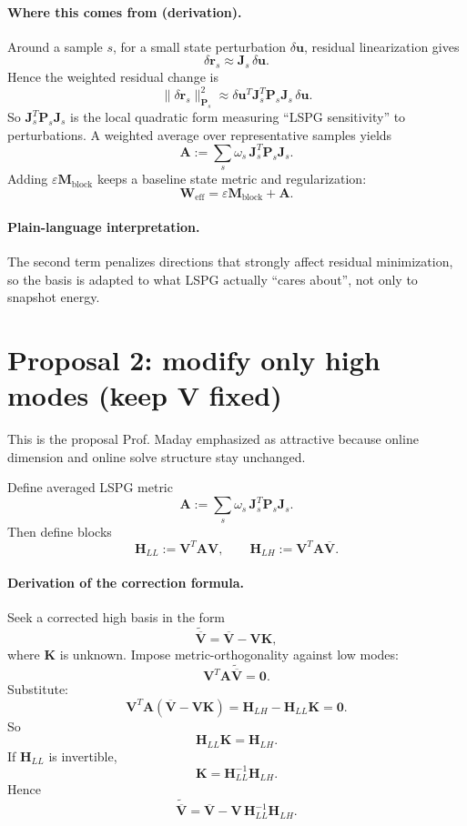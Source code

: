 \documentclass[11pt]{article}
\begin{document}
\paragraph{Where this comes from (derivation).}
Around a sample $s$, for a small state perturbation $\delta\mathbf u$, residual linearization gives
\[
\delta\mathbf r_s\approx \mathbf J_s\,\delta\mathbf u.
\]
Hence the weighted residual change is
\[
\|\delta\mathbf r_s\|_{\mathbf P_s}^2
\approx
\delta\mathbf u^T\mathbf J_s^T\mathbf P_s\mathbf J_s\,\delta\mathbf u.
\]
So $\mathbf J_s^T\mathbf P_s\mathbf J_s$ is the local quadratic form measuring ``LSPG sensitivity'' to perturbations.
A weighted average over representative samples yields
\[
\mathbf A:=\sum_s\omega_s\,\mathbf J_s^T\mathbf P_s\mathbf J_s.
\]
Adding $\varepsilon\mathbf M_{\mathrm{block}}$ keeps a baseline state metric and regularization:
\[
\mathbf W_{\mathrm{eff}}=\varepsilon\mathbf M_{\mathrm{block}}+\mathbf A.
\]

\paragraph{Plain-language interpretation.}
The second term penalizes directions that strongly affect residual minimization, so the basis is adapted to what LSPG actually ``cares about'', not only to snapshot energy.

\section{Proposal 2: modify only high modes (keep $\mathbf V$ fixed)}
This is the proposal Prof. Maday emphasized as attractive because online dimension and online solve structure stay unchanged.

Define averaged LSPG metric
\[
\mathbf A:=\sum_s \omega_s\,\mathbf J_s^T\mathbf P_s\mathbf J_s.
\]
Then define blocks
\[
\mathbf H_{LL}:=\mathbf V^T\mathbf A\mathbf V,
\qquad
\mathbf H_{LH}:=\mathbf V^T\mathbf A\overline{\mathbf V}.
\]
\paragraph{Derivation of the correction formula.}
Seek a corrected high basis in the form
\[
\widetilde{\overline{\mathbf V}}=\overline{\mathbf V}-\mathbf V\mathbf K,
\]
where $\mathbf K$ is unknown.
Impose metric-orthogonality against low modes:
\[
\mathbf V^T\mathbf A\widetilde{\overline{\mathbf V}}=\mathbf0.
\]
Substitute:
\[
\mathbf V^T\mathbf A(\overline{\mathbf V}-\mathbf V\mathbf K)
=
\mathbf H_{LH}-\mathbf H_{LL}\mathbf K
=
\mathbf0.
\]
So
\[
\mathbf H_{LL}\mathbf K=\mathbf H_{LH}.
\]
If $\mathbf H_{LL}$ is invertible,
\[
\mathbf K=\mathbf H_{LL}^{-1}\mathbf H_{LH}.
\]
Hence
\[
\widetilde{\overline{\mathbf V}}
=
\overline{\mathbf V}
-\mathbf V\,\mathbf H_{LL}^{-1}\mathbf H_{LH}.
\]
\end{document}
